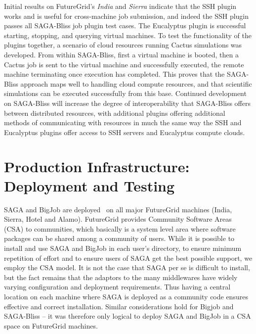 \documentclass[]{paper}
\begin{document}
Initial results on FutureGrid's \textit{India} and \textit{Sierra} indicate
that the SSH plugin works and is useful for cross-machine job submission, and
indeed the SSH plugin passes all SAGA-Bliss job plugin test cases.  The
Eucalyptus plugin is successful starting, stopping, and querying virtual
machines.  To test the functionality of the plugins together, a scenario of
cloud resources running Cactus simulations was developed.  From within
SAGA-Bliss, first a virtual machine is booted, then a Cactus job is sent to the
virtual machine and successfully executed, the remote machine terminating once
execution has completed.  This proves that the SAGA-Bliss approach maps well to
handling cloud compute resources, and that scientific simulations can be
executed successfully from this base.  Continued development on SAGA-Bliss will
increase the degree of interoperability that SAGA-Bliss offers between
distributed resources, with additional plugins offering additional methods of
communicating with resources in much the same way the SSH and Eucalyptus
plugins offer access to SSH servers and Eucalyptus compute clouds.


\section{Production Infrastructure: Deployment and Testing}

SAGA and BigJob are deployed~\cite{saga-depl} on all major FutureGrid machines (India,
Sierra, Hotel and Alamo).  FutureGrid provides Community Software
Areas (CSA) to communities, which basically is a system level area
where software packages can be shared among a community of users.
While it is possible to install and use SAGA and BigJob in each user's
directory, to ensure minimum repetition of effort and to ensure users
of SAGA get the best possible support, we employ the CSA model.  It is
not the case that SAGA per se is difficult to install, but the fact
remains that the adaptors to the many middlewares have widely varying
configuration and deployment requirements.  Thus having a central
location on each machine where SAGA is deployed as a community code
ensures effective and correct installation.  Similar considerations
hold for Bigjob and SAGA-Bliss -- it was therefore only logical to deploy
SAGA and BigJob in a CSA space on FutureGrid machines.
\end{document}
